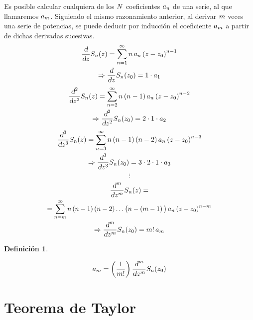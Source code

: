 \documentclass[a5paper,12pt,twoside]{book}
\newtheorem{defn}{{Definición}}[chapter]
\begin{document}
Es posible calcular cualquiera de los $N$ coeficientes $a_n$ de una serie, al que llamaremos $a_m$. Siguiendo el mismo razonamiento anterior, al derivar $m$ veces una serie de potencias, se puede deducir por inducción el coeficiente $a_m$ a partir de dichas derivadas sucesivas.
\begin{multline*}
    \frac{\textsl{d}}{\textsl{d} z} S_n(z) = \sum_{n=1}^\infty n \, a_n \left(z-z_0\right)^{n-1}
    \\
    \Rightarrow \frac{\textsl{d}}{\textsl{d} z} S_n(z_0) = 1 \cdot a_1
\end{multline*}
\begin{multline*}
    \frac{\textsl{d}^2}{\textsl{d} z^2} S_n(z) = \sum_{n=2}^\infty n \left(n-1\right) a_n \left(z-z_0\right)^{n-2}
    \\
    \Rightarrow \frac{\textsl{d}^2}{\textsl{d} z^2} S_n(z_0) = 2 \cdot 1 \cdot a_2
\end{multline*}
\begin{multline*}
    \frac{\textsl{d}^3}{\textsl{d} z^3} S_n(z) = \sum_{n=3}^\infty n \left(n-1\right) \left(n-2\right) a_n \left(z-z_0\right)^{n-3}
    \\
    \Rightarrow \frac{\textsl{d}^3}{\textsl{d} z^3} S_n(z_0) = 3 \cdot 2 \cdot 1 \cdot a_3
\end{multline*}
\begin{equation*}
    \vdots
\end{equation*}
\begin{multline*}
    \frac{\dif^\mth}{\dif z^\mth} S_\nth (z) =
    \\
    \scale{0.96}{
    = \sum_{\nth=\mth}^\infty \nth \left(\nth-1\right) \left(\nth-2\right) \dots \big( \nth-\left(\mth-1\right) \big) \, a_\nth \left(z-z_0\right)^{\nth-\mth}
    }
    \\
    \Rightarrow \frac{\dif^\mth}{\dif z^\mth} S_\nth(z_0) = \mth! \, a_\mth
\end{multline*}

\begin{mdframed}[style=MyFrame1]
    \begin{defn}
    \end{defn}
    \begin{equation*}
        a_m = \left( \frac{1}{m!} \right) \frac{\textsl{d}^m}{\textsl{d} z^m} S_n(z_0)
    \end{equation*}
\end{mdframed}


\section{Teorema de Taylor}
\end{document}
